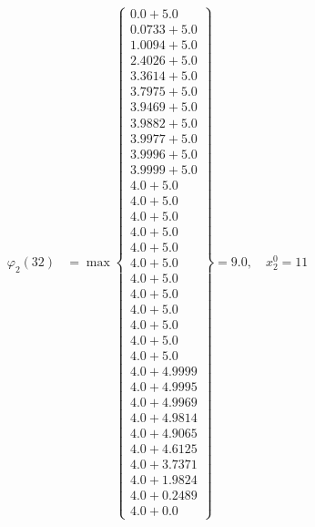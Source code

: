 \documentclass{article}
\begin{document}
\begin{align*}
  
\varphi_{2}(32) &= \max \left\{ \begin{array}{c}
0.0 + 5.0 \\
 0.0733 + 5.0 \\
 1.0094 + 5.0 \\
 2.4026 + 5.0 \\
 3.3614 + 5.0 \\
 3.7975 + 5.0 \\
 3.9469 + 5.0 \\
 3.9882 + 5.0 \\
 3.9977 + 5.0 \\
 3.9996 + 5.0 \\
 3.9999 + 5.0 \\
 4.0 + 5.0 \\
 4.0 + 5.0 \\
 4.0 + 5.0 \\
 4.0 + 5.0 \\
 4.0 + 5.0 \\
 4.0 + 5.0 \\
 4.0 + 5.0 \\
 4.0 + 5.0 \\
 4.0 + 5.0 \\
 4.0 + 5.0 \\
 4.0 + 5.0 \\
 4.0 + 5.0 \\
 4.0 + 4.9999 \\
 4.0 + 4.9995 \\
 4.0 + 4.9969 \\
 4.0 + 4.9814 \\
 4.0 + 4.9065 \\
 4.0 + 4.6125 \\
 4.0 + 3.7371 \\
 4.0 + 1.9824 \\
 4.0 + 0.2489 \\
 4.0 + 0.0
\end{array} \right\}=9.0,\quad x_{2}^0=11\\
  
  
  

\end{align*}
\end{document}
